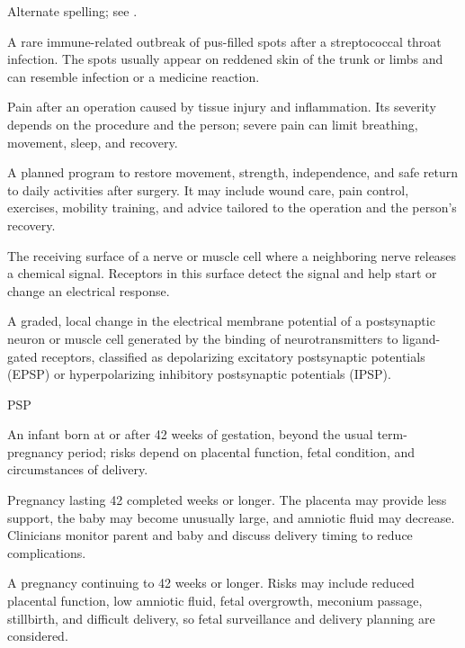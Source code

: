 Alternate spelling; see .

 A rare immune-related outbreak of pus-filled spots after a streptococcal throat infection. The spots usually appear on reddened skin of the trunk or limbs and can resemble infection or a medicine reaction.

 Pain after an operation caused by tissue injury and inflammation. Its severity depends on the procedure and the person; severe pain can limit breathing, movement, sleep, and recovery.

 A planned program to restore movement, strength, independence, and safe return to daily activities after surgery. It may include wound care, pain control, exercises, mobility training, and advice tailored to the operation and the person’s recovery.

 The receiving surface of a nerve or muscle cell where a neighboring nerve releases a chemical signal. Receptors in this surface detect the signal and help start or change an electrical response.

 A graded, local change in the electrical membrane potential of a postsynaptic neuron or muscle cell generated by the binding of neurotransmitters to ligand-gated receptors, classified as depolarizing excitatory postsynaptic potentials (EPSP) or hyperpolarizing inhibitory postsynaptic potentials (IPSP).

\synonyms
PSP

 An infant born at or after 42 weeks of gestation, beyond the usual term-pregnancy period; risks depend on placental function, fetal condition, and circumstances of delivery.

 Pregnancy lasting 42 completed weeks or longer. The placenta may provide less support, the baby may become unusually large, and amniotic fluid may decrease. Clinicians monitor parent and baby and discuss delivery timing to reduce complications.

 A pregnancy continuing to 42 weeks or longer. Risks may include reduced placental function, low amniotic fluid, fetal overgrowth, meconium passage, stillbirth, and difficult delivery, so fetal surveillance and delivery planning are considered.

